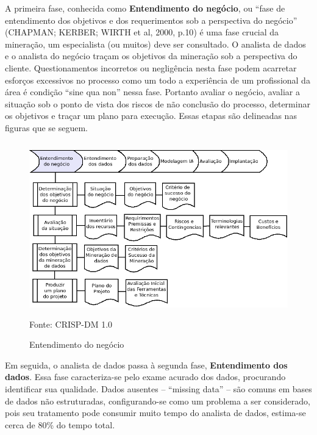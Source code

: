 A primeira fase, conhecida como \textbf{Entendimento do negócio}, ou ``fase de entendimento dos objetivos e dos requerimentos sob a 
perspectiva do negócio'' (CHAPMAN; KERBER; WIRTH et al, 2000, p.{10}) é uma fase crucial da mineração,  um especialista (ou muitos) deve ser consultado. 
O analista de dados e o analista do negócio traçam os objetivos da mineração sob a perspectiva do cliente. Questionamentos incorretos 
ou negligência nesta fase podem acarretar esforços excessivos no processo como um todo a experiência de um profissional da área 
é condição ``sine qua non'' nessa fase. Portanto avaliar o negócio, avaliar a situação sob o ponto de vista dos riscos de não conclusão 
do processo, determinar os objetivos e traçar um plano para execução. Essas etapas são delineadas nas figuras que se seguem.

\begin{figure}[!ht]
\centering
\caption{Entendimento do negócio}
\vspace{1mm}
\includegraphics[width=120mm, height=75mm]{Figuras/Cronograma/Entendimento.png}\\
\tiny Fonte: CRISP-DM 1.0
\end{figure}

\pagebreak

\vspace{0.5cm}

Em seguida, o analista de dados passa à segunda fase, \textbf{Entendimento dos dados}. Essa fase caracteriza-se pelo exame acurado dos dados, procurando identificar sua qualidade. 
Dados ausentes -- ``missing data'' -- são comuns em bases de dados não estruturadas, configurando-se como
um problema a ser considerado, pois seu tratamento pode consumir muito tempo do analista de dados, estima-se cerca de 80\% do tempo total. 

